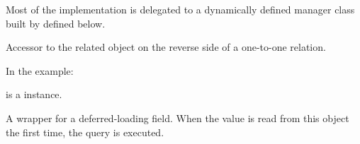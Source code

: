 \documentclass[letterpaper,10pt,english]{sphinxmanual}
\begin{document}
\begin{fulllineitems}
\begin{fulllineitems}
Most of the implementation is delegated to a dynamically defined manager
class built by  defined below.

\end{fulllineitems}


\begin{fulllineitems}
\label{\detokenize{QuChemPedIA.models:QuChemPedIA.models.VersionModel.SoftwareVersion.importrule}}
Accessor to the related object on the reverse side of a one-to-one
relation.

In the example:

%
\begin{sphinxVerbatim}[commandchars=\\\{\}]
 
       
\end{sphinxVerbatim}

 is a  instance.

\end{fulllineitems}


\begin{fulllineitems}
\label{\detokenize{QuChemPedIA.models:QuChemPedIA.models.VersionModel.SoftwareVersion.objects}}
\end{fulllineitems}


\begin{fulllineitems}
\label{\detokenize{QuChemPedIA.models:QuChemPedIA.models.VersionModel.SoftwareVersion.version_number}}
A wrapper for a deferred-loading field. When the value is read from this
object the first time, the query is executed.

\end{fulllineitems}


\end{fulllineitems}
\end{document}
